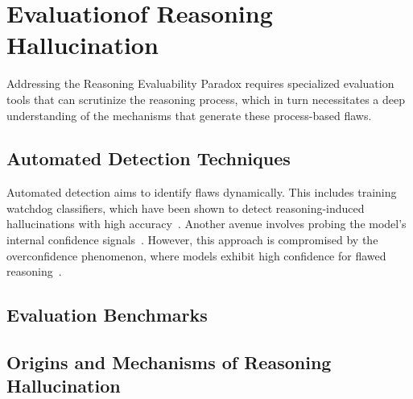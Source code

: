 \vspace{-2mm}\section{Evaluationof Reasoning Hallucination}\vspace{-1mm}
\label{sec:evaluation}

Addressing the Reasoning Evaluability Paradox requires specialized evaluation tools that can scrutinize the reasoning process, which in turn necessitates a deep understanding of the mechanisms that generate these process-based flaws.

\subsection{Automated Detection Techniques}

Automated detection aims to identify flaws dynamically.
This includes training watchdog classifiers, which have been shown to detect reasoning-induced hallucinations with high accuracy~\cite{jiang2024large}.
Another avenue involves probing the model's internal confidence signals~\cite{chen2024teaching}.
However, this approach is compromised by the overconfidence phenomenon, where models exhibit high confidence for flawed reasoning~\cite{yao2025reasoning}.  %

\subsection{Evaluation Benchmarks}

\subsection{Origins and Mechanisms of Reasoning Hallucination}
